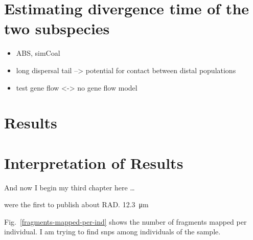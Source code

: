 \documentclass[a4paper,12pt,times,print,index, custombib]{PhDThesisPSnPDF}\usepackage[]{graphicx}\usepackage[]{color}
\begin{document}
\section{Estimating divergence time of the two subspecies}

\begin{itemize}
\item ABS, simCoal
\item long dispersal tail --> potential for contact between distal populations
\item test gene flow <-> no gene flow model
\end{itemize}


\section{Results}

\section{Interpretation of Results}



And now I begin my third chapter here \dots

\cite{Baird2008} were the first to publish about RAD. \SI{12,3}{\micro\metre}

Fig.~\vref{fragments-mapped-per-ind} shows the number of \glspl{fragment} mapped per individual.
I am trying to find \glspl{snp} among individuals of the sample.
\end{document}
